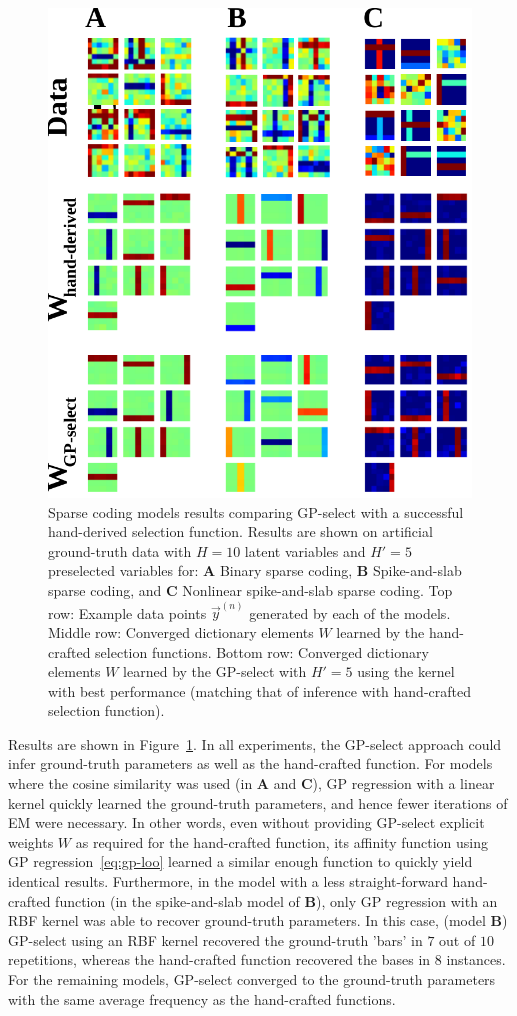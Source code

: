 \begin{figure}[t]
\begin{center}
\includegraphics[width=.45\textwidth]{figs/sparsecoding/bars-test.pdf}
\caption{Sparse coding models results comparing GP-select with a successful hand-derived selection function.
Results are shown on artificial ground-truth data with $H=10$ latent variables and $H'=5$ preselected variables for: \textbf{A} Binary sparse coding, \textbf{B} Spike-and-slab sparse coding, and \textbf{C} Nonlinear spike-and-slab sparse coding.
Top row: Example data points $\vec{y}^{(n)}$ generated by each of the models.
Middle row: Converged dictionary elements $W$ learned by the hand-crafted selection functions.
Bottom row: Converged dictionary elements $W$ learned by the GP-select with $H'=5$ using the kernel with best performance (matching that of inference with hand-crafted selection function).
}\label{fig:sparse}
\end{center}
\end{figure}

Results are shown in Figure~\ref{fig:sparse}.
In all experiments, the GP-select approach could infer ground-truth parameters as well as the hand-crafted function.
For models where the cosine similarity was used (in \textbf{A} and \textbf{C}), GP regression with a linear kernel quickly learned the ground-truth parameters, and hence fewer iterations of EM were necessary.
In other words, even without providing GP-select explicit weights $W$ as required for the hand-crafted function, its affinity function using GP regression~\eqref{eq:gp-loo} learned a similar enough function to quickly yield identical results.
Furthermore, in the model with a less straight-forward hand-crafted function (in the spike-and-slab model of \textbf{B}), only GP regression with an RBF kernel was able to recover ground-truth parameters.
In this case, (model \textbf{B}) GP-select using an RBF kernel recovered the ground-truth 'bars' in $7$ out of $10$ repetitions, whereas the hand-crafted function recovered the bases in $8$ instances.
For the remaining models, GP-select converged to the ground-truth parameters with the same average frequency as the hand-crafted functions.

